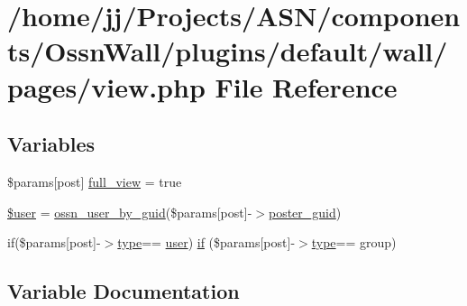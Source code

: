 \hypertarget{components_2_ossn_wall_2plugins_2default_2wall_2pages_2view_8php}{}\section{/home/jj/\+Projects/\+A\+S\+N/components/\+Ossn\+Wall/plugins/default/wall/pages/view.php File Reference}
\label{components_2_ossn_wall_2plugins_2default_2wall_2pages_2view_8php}
\subsection*{Variables}
\begin{DoxyCompactItemize}
\item 
\$params\mbox{[}\textquotesingle{}post\textquotesingle{}\mbox{]} \hyperlink{components_2_ossn_wall_2plugins_2default_2wall_2pages_2view_8php_a8aa2e512060821710745c7a77b98b65f}{full\+\_\+view} = true
\item 
\hyperlink{components_2_ossn_wall_2plugins_2default_2wall_2pages_2view_8php_a598ca4e71b15a1313ec95f0df1027ca5}{\$user} = \hyperlink{ossn_8lib_8users_8php_aaee344fada9e6e15470587c7cd94ea8b}{ossn\+\_\+user\+\_\+by\+\_\+guid}(\$params\mbox{[}\textquotesingle{}post\textquotesingle{}\mbox{]}-\/$>$\hyperlink{user_8php_a24eb7b66e353d8983f6f2af979250671}{poster\+\_\+guid})
\item 
if(\$params\mbox{[}\textquotesingle{}post\textquotesingle{}\mbox{]}-\/$>$\hyperlink{_ossn_wall_2actions_2wall_2post_2group_8php_a2dc1bb4e1ed0029daa81ac0776b14b51}{type}== \textquotesingle{}\hyperlink{ossn_8config_8db_8example_8php_a802544b7ba9f79bbf24ef67773d53bed}{user}\textquotesingle{}) \hyperlink{components_2_ossn_wall_2plugins_2default_2wall_2pages_2view_8php_a8d1c85bf219192b21592cdbaa4646be9}{if} (\$params\mbox{[}\textquotesingle{}post\textquotesingle{}\mbox{]}-\/$>$\hyperlink{_ossn_wall_2actions_2wall_2post_2group_8php_a2dc1bb4e1ed0029daa81ac0776b14b51}{type}== \textquotesingle{}group\textquotesingle{})
\end{DoxyCompactItemize}


\subsection{Variable Documentation}
